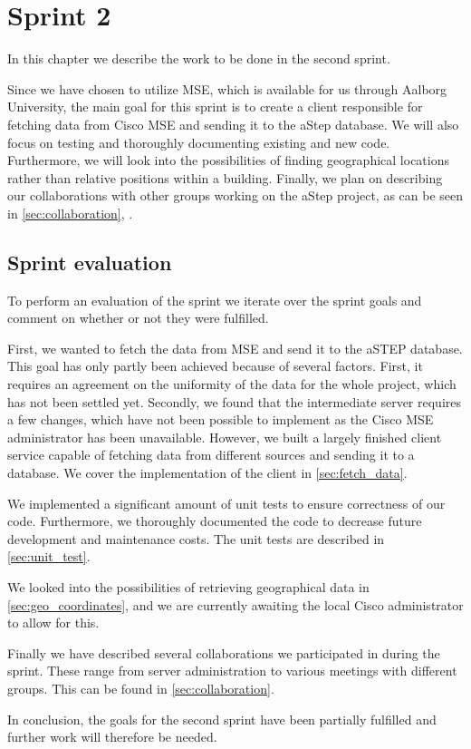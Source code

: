 \chapter{Sprint 2} \label{cha:sprint2}
In this chapter we describe the work to be done in the second sprint. 

Since we have chosen to utilize MSE, which is available for us through Aalborg University, the main goal for this sprint is to create a client responsible for fetching data from Cisco MSE and sending it to the aStep database. We will also focus on testing and thoroughly documenting existing and new code. Furthermore, we will look into the possibilities of finding geographical locations rather than relative positions within a building. Finally, we plan on describing our collaborations with other groups working on the aStep project, as can be seen in \cref{sec:collaboration}, .





\section{Sprint evaluation}\label{sec:s2_eval}
To perform an evaluation of the sprint we iterate over the sprint goals and comment on whether or not they were fulfilled.

First, we wanted to fetch the data from MSE and send it to the aSTEP database. This goal has only partly been achieved because of several factors. First, it requires an agreement on the uniformity of the data for the whole project, which has not been settled yet. Secondly, we found that the intermediate server requires a few changes, which have not been possible to implement as the Cisco MSE administrator has been unavailable. However, we built a largely finished client service capable of fetching data from different sources and sending it to a database. We cover the implementation of the client in \cref{sec:fetch_data}.

We implemented a significant amount of unit tests to ensure correctness of our code. Furthermore, we thoroughly documented the code to decrease future development and maintenance costs. The unit tests are described in \cref{sec:unit_test}.

We looked into the possibilities of retrieving geographical data in \cref{sec:geo_coordinates}, and we are currently awaiting the local Cisco administrator to allow for this.

Finally we have described several collaborations we participated in during the sprint. These range from server administration to various meetings with different groups. This can be found in \cref{sec:collaboration}. 

In conclusion, the goals for the second sprint have been partially fulfilled and further work will therefore be needed.